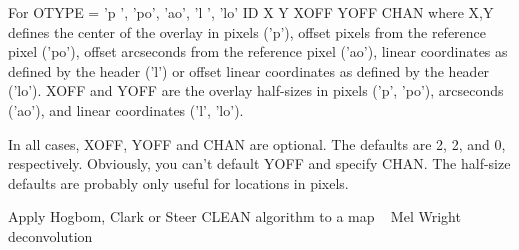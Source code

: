 {For OTYPE = 'p ', 'po', 'ao', 'l ', 'lo'
{\eightpoint\begintt
  ID  X  Y  XOFF   YOFF  CHAN
\endtt}
where X,Y defines the center of the overlay in pixels ('p'),
offset pixels from the reference pixel ('po'),
offset arcseconds from the reference pixel ('ao'),
linear coordinates as defined by the header ('l')
or offset linear coordinates as defined by the header ('lo').
XOFF and YOFF are the overlay half-sizes in pixels ('p', 'po'),
arcseconds ('ao'), and linear coordinates ('l', 'lo').

In all cases, XOFF, YOFF and CHAN are optional.  The defaults
are 2, 2, and 0, respectively.  Obviously, you can't default YOFF
and specify CHAN.  The half-size defaults are probably only useful
for locations in pixels.
\par}
%
\noindent Apply Hogbom, Clark or Steer CLEAN algorithm to a map
\newline \ 
\newline {} Mel Wright
\newline {} deconvolution
